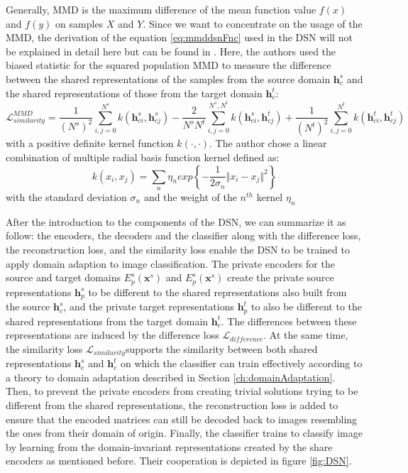 Generally, MMD is the maximum difference of the mean function value $f(x)$ and $f(y)$ on samples $X$ and $Y$. Since we want to concentrate on the usage of the MMD, the derivation of the equation \eqref{eq:mmddsnFnc} used in the DSN will not be explained in detail here but can be found in \cite{mmdOrig}. Here, the authors used the biased statistic for the squared population MMD to measure the difference between the shared representations of the samples from the source domain $\bm{h}_c^s$ and the shared representations of those from the target domain $\bm{h}_c^t$:
\begin{equation}\label{eq:mmddsnFnc}
			\mathcal{L}_{similarity}^{MMD} = \frac{1}{(N^s)^2}\overset{N^s}{\underset{i, j = 0}{\sum}}k(\bm{h}_{ci}^s, \bm{h}_{cj}^s) - \frac{2}{N^sN^t}\overset{N^s, N^t}{\underset{i, j = 0}{\sum}}k(\bm{h}_{ci}^s, \bm{h}_{cj}^t) + \frac{1}{(N^t)^2}\overset{N^t}{\underset{i, j = 0}{\sum}}k(\bm{h}_{ci}^t, \bm{h}_{cj}^t)
	\end{equation} 
with a positive definite kernel function $k(\cdot, \cdot)$. The author chose a linear combination of multiple radial basis function kernel defined as: 
\begin{equation}\label{eq:rbfFnc}
			k(x_i, x_j) = \sum_n \eta_n exp\left\{-\frac{1}{2\sigma_n}\Vert x_i - x_j\Vert^2\right\} 
	\end{equation} 
with the standard deviation $\sigma_n$ and the weight of the $n^{th}$ kernel $\eta_n$  

After the introduction to the components of the DSN, we can summarize it as follow: the encoders, the decoders and the classifier along with the difference loss, the reconstruction loss, and the similarity loss  enable the DSN to be trained to apply domain adaption to image classification. The private encoders for the source and target domains $E_p^s(\bm{x}^s)$ and $E_p^s(\bm{x}^s)$ create the private source representations $\bm{h}_p^s$ to be different to the shared representations also built from the source $\bm{h}_c^s$, and the private target representations $\bm{h}_p^t$ to also be different to the shared representations from the target domain $\bm{h}_c^t$. The differences between these representations are induced by the difference loss $\mathcal{L}_{difference}$. At the same time, the similarity loss $\mathcal{L}_{similarity}$supports the similarity between both shared representations $\bm{h}_c^s$ and $\bm{h}_c^t$ on which the classifier can train effectively according to a theory to domain adaptation described in Section \ref{ch:domainAdaptation}. Then, to prevent the private encoders from creating trivial solutions trying to be different from the shared representations, the reconstruction loss is added to ensure that the encoded matrices can still be decoded back to images resembling the ones from their domain of origin. Finally, the classifier trains to classify image by learning from the domain-invariant representations created by the share encoders as mentioned before. Their cooperation is depicted in figure \ref{fig:DSN}.

